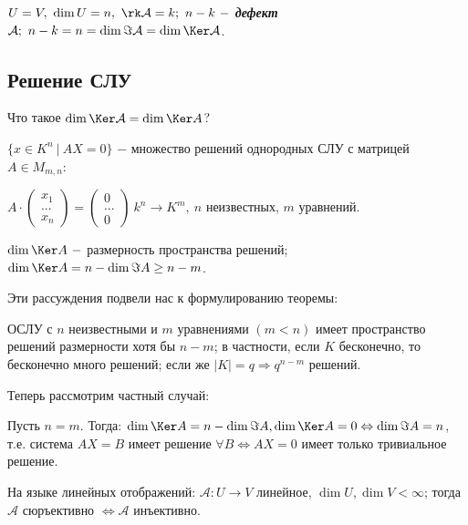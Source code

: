 \begin{definition}
    $U=V,\ \dim U=n, \ \rk \mathcal{A}=k;\ n-k\ -$ 
\textbf{\textit{дефект}} $\mathcal{A};\ n-k=n=\dim\Im \mathcal{A}=\dim\Ker 
\mathcal{A}$.
\end{definition} 

\subsection{Решение СЛУ}
Что такое $\dim \Ker \mathcal{A} = \dim \Ker A$?

$\{x\in K^n\ |\ AX=0\}$ $-$ множество решений однородных СЛУ с матрицей 
$A\in M_{m,n}$: 

$A\cdot\begin{pmatrix}
     x_1 \\
     ... \\
     x_n
\end{pmatrix}=\begin{pmatrix}
    0 \\
    ... \\
    0
\end{pmatrix}\ k^n\rightarrow K^m,\ n$ неизвестных, $m$ уравнений.

$\dim \Ker A\ -$ размерность пространства решений; $\dim \Ker A = n - \dim 
\Im A \geq n - m$.

Эти рассуждения подвели нас к формулированию теоремы:

\begin{theorem}
    ОСЛУ с $n$ неизвестными и $m$ уравнениями $(m<n)$ имеет пространство 
решений размерности хотя бы $n-m$; в частности, если $K$ бесконечно, то 
бесконечно много решений; если же $|K|=q\Rightarrow q^{n-m}$ решений.
\end{theorem}

Теперь рассмотрим частный случай:

\begin{theorem}
    Пусть $n=m$. Тогда: $\dim\Ker A = n - \dim \Im A, \dim \Ker 
A=0\Leftrightarrow \dim \Im A = n$, т.е. система $AX=B$ имеет решение 
$\forall B\Leftrightarrow AX=0$ имеет только тривиальное решение.

    На языке линейных отображений: $\mathcal{A}:U\rightarrow V$ линейное, 
$\dim U, \dim V<\infty$; тогда $\mathcal{A}$ сюръективно $\Leftrightarrow 
\mathcal{A}$ инъективно.
\end{theorem}

